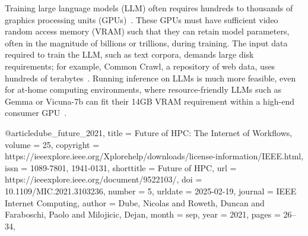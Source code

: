 
Training large language models (LLM) often requires hundreds to thousands of graphics processing units (GPUs)~\citep{jiang2024megascalescalinglargelanguage}. These GPUs must have sufficient video random access memory (VRAM) such that they can retain model parameters, often in the magnitude of billions or trillions, during training. The input data required to train the LLM, such as text corpora, demands large disk requirements; for example, Common Crawl, a repository of web data, uses hundreds of terabytes~\citep{8311752}. Running inference on LLMs is much more feasible, even for at-home computing environments, where resource-friendly LLMs such as Gemma or Vicuna-7b can fit their 14GB VRAM requirement within a high-end consumer GPU~\citep{xu2024surveyresourceefficientllmmultimodal}.






@article{dube_future_2021,
	title = {Future of {HPC}: {The} {Internet} of {Workflows}},
	volume = {25},
	copyright = {https://ieeexplore.ieee.org/Xplorehelp/downloads/license-information/IEEE.html},
	issn = {1089-7801, 1941-0131},
	shorttitle = {Future of {HPC}},
	url = {https://ieeexplore.ieee.org/document/9522103/},
	doi = {10.1109/MIC.2021.3103236},
	number = {5},
	urldate = {2025-02-19},
	journal = {IEEE Internet Computing},
	author = {Dube, Nicolas and Roweth, Duncan and Faraboschi, Paolo and Milojicic, Dejan},
	month = sep,
	year = {2021},
	pages = {26--34},
}


